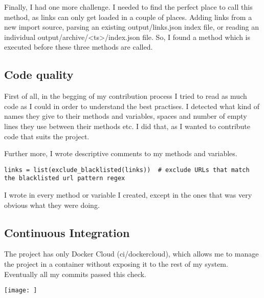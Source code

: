 \documentclass{article}
\begin{document}
Finally, I had one more challenge. I needed to find the perfect place to call this method, as links can only get loaded in a couple of places. Adding links from a new import source, parsing an existing output/links.json index file, or reading an individual output/archive/<ts>/index.json file.
So, I found a method which is executed before these three methods are called. 

\subsection{Code quality}

First of all, in the begging of my contribution process I tried to read as much code as I could in order to understand the best practises. I detected what kind of names they give to their methods and variables, spaces and number of empty lines they use between their methods etc. I did that, as I wanted to contribute code that suits the project.

Further more, I wrote descriptive comments to my methods and variables. 
\begin{verbatim}
links = list(exclude_blacklisted(links))  # exclude URLs that match
the blacklisted url pattern regex
\end{verbatim}

I wrote in every method or variable I created, except in the ones that was very obvious what they were doing.

\subsection{Continuous Integration}
The project has only Docker Cloud (ci/dockercloud), which allows me to manage the project in a container without exposing it to the rest of my system. Eventually all my commits passed this check.

\texttt{[image: ]}
\end{document}

